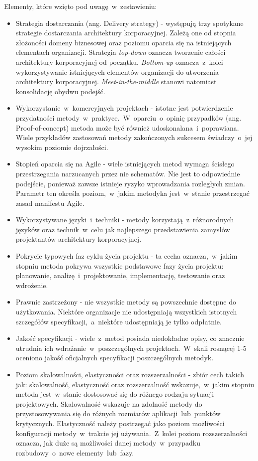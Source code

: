 Elementy, które wzięto pod uwagę~w~zestawieniu:
\begin{itemize}
\item{Strategia dostarczania (ang. Delivery strategy) - występują trzy spotykane strategie dostarczania architektury korporacyjnej. Zależą one od stopnia złożoności domeny biznesowej oraz poziomu oparcia się na istniejących elementach organizacji. Strategia \emph{top-down} oznacza tworzenie całości architektury korporacyjnej od początku. \emph{Bottom-up} oznacza~z~kolei wykorzystywanie istniejących elementów organizacji do utworzenia architektury korporacyjnej. \emph{Meet-in-the-middle} stanowi natomiast konsolidację obydwu podejść. }
\item{Wykorzystanie~w~komercyjnych projektach - istotne jest potwierdzenie przydatności metody~w~praktyce.~W~oparciu~o~opinię przypadków (ang. Proof-of-concept) metoda może być również udoskonalana~i~poprawiana. Wiele przykładów zastosowań metody zakończonych sukcesem świadczy~o~jej wysokim poziomie dojrzałości.}
\item{Stopień oparcia się na Agile - wiele istniejących metod wymaga ścisłego przestrzegania narzucanych przez nie schematów. Nie jest to odpowiednie podejście, ponieważ zawsze istnieje ryzyko wprowadzania rozległych zmian. Parametr ten określa poziom,~w~jakim metodyka jest~w~stanie przestrzegać zasad manifestu Agile.}
\item{Wykorzystywane języki~i~techniki - metody korzystają~z~różnorodnych języków oraz technik~w~celu jak najlepszego przedstawienia zamysłów projektantów architektury korporacyjnej.}
\item{Pokrycie typowych faz cyklu życia projektu - ta cecha oznacza,~w~jakim stopniu metoda pokrywa wszystkie podstawowe fazy życia projektu: planowanie, analizę~i~projektowanie, implementację, testowanie oraz wdrożenie.}
\item{Prawnie zastrzeżony - nie wszystkie metody są powszechnie dostępne do użytkowania. Niektóre organizacje nie udostępniają wszystkich istotnych szczegółów specyfikacji,~a~niektóre udostępniają je tylko odpłatnie.}
\item{Jakość specyfikacji - wiele~z~metod posiada niedokładne opisy, co znacznie utrudnia ich wdrażanie~w~poszczególnych projektach.~W~skali rosnącej 1-5 oceniono jakość oficjalnych specyfikacji poszczególnych metodyk. }
\item{Poziom skalowalności, elastyczności oraz rozszerzalności - zbiór cech takich jak: skalowalność, elastyczność oraz rozszerzalność wskazuje,~w~jakim stopniu metoda jest~w~stanie dostosować się do różnego rodzaju sytuacji projektowych. Skalowalność wskazuje na zdolność metody do przystosowywania się do różnych rozmiarów aplikacji~lub~punktów krytycznych. Elastyczność należy postrzegać jako poziom możliwości konfiguracji metody~w~trakcie jej używania.~Z~kolei poziom rozszerzalności oznacza, jak duże są możliwości danej metody~w~przypadku rozbudowy~o~nowe elementy~lub~fazy. }
\end{itemize}

